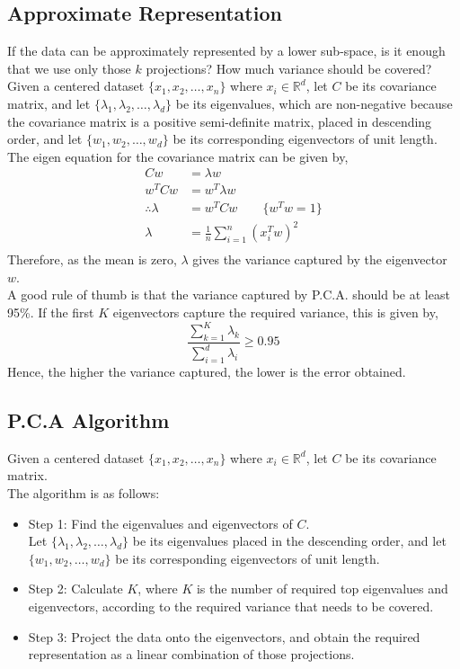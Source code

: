 \documentclass[letterpaper,11pt]{article}
\begin{document}
\subsection{Approximate Representation}
If the data can be approximately represented by a lower sub-space, is it enough that we use only those $k$ projections? How much variance should be covered?
\newpage
Given a centered dataset $\{x_1, x_2, \ldots, x_n\}$ where $x_i \in \mathbb{R}^{d}$, let $C$ be its covariance matrix, and let $\{\lambda_1, \lambda_2, \ldots, \lambda_d \}$ be its eigenvalues, which are non-negative because the covariance matrix is a positive semi-definite matrix, placed in descending order, and let $\{w_1, w_2, \ldots, w_d \}$ be its corresponding eigenvectors of unit length. \\
The eigen equation for the covariance matrix can be given by,
\begin{align*}
    Cw &= \lambda w \\
    w^TCw &= w^T\lambda w\\
    \therefore \lambda &= w^TCw \hspace{2em} \{w^Tw = 1\} \\
    \lambda &= \frac{1}{n} \sum _{i=1} ^{n} (x_i^Tw)^2 \\
\end{align*}
Therefore, as the mean is zero, $\lambda$ gives the variance captured by the eigenvector $w$. \\
A good rule of thumb is that the variance captured by P.C.A. should be at least 95\%. 
If the first $K$ eigenvectors capture the required variance, this is given by,
$$
\frac{\displaystyle \sum _{k=1} ^{K} \lambda_k}{\displaystyle \sum _{i=1} ^{d} \lambda_i} \ge 0.95
$$ 
Hence, the higher the variance captured, the lower is the error obtained.

\subsection{P.C.A Algorithm}
Given a centered dataset $\{x_1, x_2, \ldots, x_n\}$ where $x_i \in \mathbb{R}^{d}$, let $C$ be its covariance matrix.\\
The algorithm is as follows:
\begin{itemize}
    \item Step 1: Find the eigenvalues and eigenvectors of $C$. \\
    Let $\{\lambda_1, \lambda_2, \ldots, \lambda_d \}$ be its eigenvalues placed in the descending order, and let $\{w_1, w_2, \ldots, w_d \}$ be its corresponding eigenvectors of unit length.
    \item Step 2: Calculate $K$, where $K$ is the number of required top eigenvalues and eigenvectors, according to the required variance that needs to be covered.
    \item Step 3: Project the data onto the eigenvectors, and obtain the required representation as a linear combination of those projections. 
\end{itemize}
\end{document}
